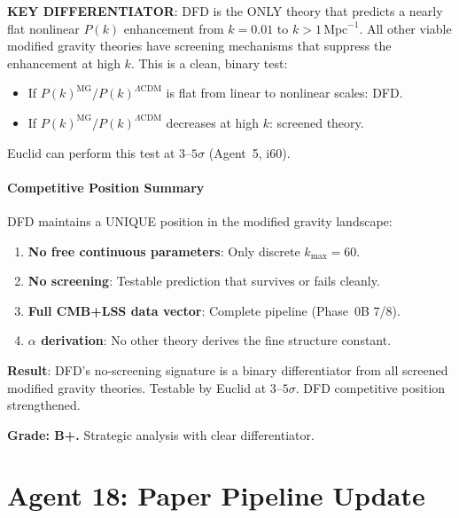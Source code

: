 \documentclass[11pt,a4paper]{article}
\begin{document}
\textbf{KEY DIFFERENTIATOR}: DFD is the ONLY theory that predicts a nearly flat nonlinear $P(k)$ enhancement from $k = 0.01$ to $k > 1\,\mathrm{Mpc}^{-1}$. All other viable modified gravity theories have screening mechanisms that suppress the enhancement at high $k$. This is a clean, binary test:

\begin{itemize}
\item If $P(k)^{\mathrm{MG}}/P(k)^{\Lambda\mathrm{CDM}}$ is flat from linear to nonlinear scales: DFD.
\item If $P(k)^{\mathrm{MG}}/P(k)^{\Lambda\mathrm{CDM}}$ decreases at high $k$: screened theory.
\end{itemize}

Euclid can perform this test at $3$--$5\sigma$ (Agent~5, i60).

\subsection{Competitive Position Summary}

DFD maintains a UNIQUE position in the modified gravity landscape:
\begin{enumerate}
\item \textbf{No free continuous parameters}: Only discrete $k_{\max} = 60$.
\item \textbf{No screening}: Testable prediction that survives or fails cleanly.
\item \textbf{Full CMB+LSS data vector}: Complete pipeline (Phase~0B 7/8).
\item \textbf{$\alpha$ derivation}: No other theory derives the fine structure constant.
\end{enumerate}

\begin{tcolorbox}[colback=green!5!white, colframe=green!60!black, title={Agent 17: Competition Update --- NO-SCREENING SIGNATURE IDENTIFIED}]
\textbf{Result}: DFD's no-screening signature is a binary differentiator from all screened modified gravity theories. Testable by Euclid at $3$--$5\sigma$. DFD competitive position strengthened.

\textbf{Grade: B+.} Strategic analysis with clear differentiator.
\end{tcolorbox}


\part{Agent 18: Paper Pipeline Update}
\label{part:papers}
\end{document}
